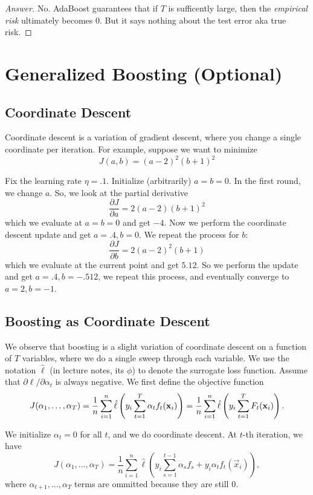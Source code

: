 \documentclass{discussion}
\newenvironment{answer}
  {\vspace{-1em}\begin{proof}[Answer]}
  {\end{proof}}
\begin{document}
\begin{answer}
  No. AdaBoost guarantees that if $T$ is sufficently large, then the \emph{empirical risk} ultimately becomes 0. But it says nothing about the test error aka true risk.
\end{answer}

\section{Generalized Boosting (Optional)}

\subsection{Coordinate Descent}
Coordinate descent is a variation of gradient descent, where you change a single coordinate per iteration. For example, suppose we want to minimize 
\[J(a,b) = (a - 2)^2 (b + 1)^2 \]

Fix the learning rate $\eta = .1$. Initialize (arbitrarily) $a=b=0$. In the first round, we change $a$. So, we look at the partial derivative 
\[\frac{\partial J}{\partial a} = 2(a-2)(b+1)^2\]
which we evaluate at $a=b=0$ and get $-4$. Now we perform the coordinate descent update and get $a=.4, b=0$. We repeat the process for $b$:
\[\frac{\partial J}{\partial b} = 2(a-2)^2(b+1)\]
which we evaluate at the current point and get $5.12$. So we perform the update and get $a=.4,b= -.512$, we repeat this process, and eventually converge to $a=2, b=-1$.


\subsection{Boosting as Coordinate Descent}
We observe that boosting is a slight variation of coordinate descent on a function of $T$ variables, where we do a single sweep through each variable. We use the notation $\hat{\ell}$ (in lecture notes, its $\phi$) to denote the surrogate loss function. Assume that $\partial{\ell}/\partial{\alpha_t}$ is always negative. We first define the objective function
\[J(\alpha_1, \ldots, \alpha_T) = \frac{1}{n} \sum_{i=1}^{n}\hat{\ell}\left(y_i \sum_{t=1}^{T} \alpha_{t}f_t (\mathbf{x}_i)\right) =  \frac{1}{n} \sum_{i=1}^{n}\hat{\ell}\left(y_i \sum_{t=1}^{T} F_t (\mathbf{x}_i)\right).\]

We initialize $\alpha_t = 0$ for all $t$, and we do coordinate descent. At $t$-th iteration, we have
\[J(\alpha_1, \ldots, \alpha_{T}) = \frac{1}{n} \sum_{i=1}^{n}\hat{\ell}\left(y_i \sum_{s=1}^{t-1} \alpha_{s}f_s + y_i \alpha_t f_t (\vec{x}_i)\right),\]
where $\alpha_{t+1}, \ldots, \alpha_T$ terms are ommitted because they are still 0.
\end{document}
